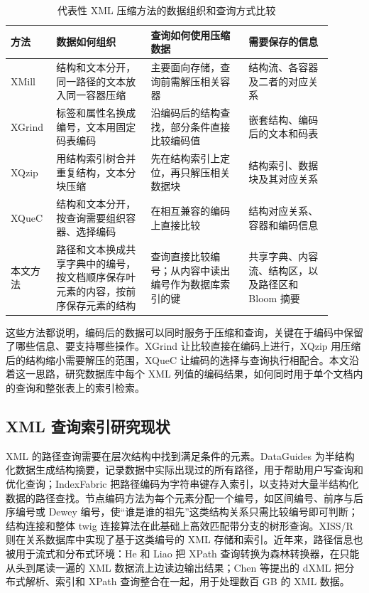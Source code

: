 \begin{table}[htbp]
\centering\small
\caption{代表性 XML 压缩方法的数据组织和查询方式比较}
\label{tab:related-compression-methods}
\setlength{\tabcolsep}{4pt}
\begin{tabular}{p{0.11\linewidth}p{0.27\linewidth}p{0.28\linewidth}p{0.24\linewidth}}
\toprule
方法 & 数据如何组织 & 查询如何使用压缩数据 & 需要保存的信息 \\
\midrule
XMill\cite{liefke2000xmill} & 结构和文本分开，同一路径的文本放入同一容器压缩 & 主要面向存储，查询前需解压相关容器 & 结构流、各容器及二者的对应关系 \\
XGrind\cite{tolani2002xgrind} & 标签和属性名换成编号，文本用固定码表编码 & 沿编码后的结构查找，部分条件直接比较编码值 & 嵌套结构、编码后的文本和码表 \\
XQzip\cite{cheng2004xqzip} & 用结构索引树合并重复结构，文本分块压缩 & 先在结构索引上定位，再只解压相关数据块 & 结构索引、数据块及其对应关系 \\
XQueC\cite{arion2007xquec} & 结构和文本分开，按查询需要组织容器、选择编码 & 在相互兼容的编码上直接比较 & 结构对应关系、容器和编码信息 \\
本文方法 & 路径和文本换成共享字典中的编号，按文档顺序保存叶元素的内容，按前序保存元素的结构 & 查询直接比较编号；从内容中读出编号作为数据库索引的键 & 共享字典、内容流、结构区，以及路径区和 Bloom 摘要 \\
\bottomrule
\end{tabular}
\end{table}

这些方法都说明，编码后的数据可以同时服务于压缩和查询，关键在于编码中保留了哪些信息、要支持哪些操作。XGrind 让比较直接在编码上进行，XQzip 用压缩后的结构缩小需要解压的范围，XQueC 让编码的选择与查询执行相配合。本文沿着这一思路，研究数据库中每个 XML 列值的编码结果，如何同时用于单个文档内的查询和整张表上的索引检索。

\subsection{XML 查询索引研究现状}

XML 的路径查询需要在层次结构中找到满足条件的元素。DataGuides 为半结构化数据生成结构摘要，记录数据中实际出现过的所有路径，用于帮助用户写查询和优化查询\cite{goldman1997dataguides}；IndexFabric 把路径编码为字符串键存入索引，以支持对大量半结构化数据的路径查找\cite{cooper2001fast}。节点编码方法为每个元素分配一个编号，如区间编号、前序与后序编号或 Dewey 编号，使“谁是谁的祖先”这类结构关系只需比较编号即可判断\cite{zhang2001supporting,grust2002accelerating,tatarinov2002storing}；结构连接和整体 twig 连接算法在此基础上高效匹配带分支的树形查询\cite{alkhalifa2002structural,bruno2002holistic}。XISS/R 则在关系数据库中实现了基于这类编号的 XML 存储和索引\cite{harding2003xissr}。近年来，路径信息也被用于流式和分布式环境：He 和 Liao 把 XPath 查询转换为森林转换器，在只能从头到尾读一遍的 XML 数据流上边读边输出结果\cite{he2017xml}；Chen 等提出的 dXML 把分布式解析、索引和 XPath 查询整合在一起，用于处理数百 GB 的 XML 数据\cite{chen2024integrated}。

